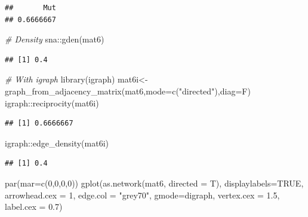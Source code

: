 \documentclass[
  notitlepage,
  onecolumn,
  openany]{book}
\newenvironment{Shaded}{\begin{snugshade}}{\end{snugshade}}
\newcommand{\AttributeTok}[1]{\textcolor[rgb]{0.77,0.63,0.00}{#1}}
\newcommand{\CommentTok}[1]{\textcolor[rgb]{0.56,0.35,0.01}{\textit{#1}}}
\newcommand{\ConstantTok}[1]{\textcolor[rgb]{0.00,0.00,0.00}{#1}}
\newcommand{\DecValTok}[1]{\textcolor[rgb]{0.00,0.00,0.81}{#1}}
\newcommand{\FloatTok}[1]{\textcolor[rgb]{0.00,0.00,0.81}{#1}}
\newcommand{\FunctionTok}[1]{\textcolor[rgb]{0.00,0.00,0.00}{#1}}
\newcommand{\NormalTok}[1]{#1}
\newcommand{\OtherTok}[1]{\textcolor[rgb]{0.56,0.35,0.01}{#1}}
\newcommand{\SpecialCharTok}[1]{\textcolor[rgb]{0.00,0.00,0.00}{#1}}
\newcommand{\StringTok}[1]{\textcolor[rgb]{0.31,0.60,0.02}{#1}}
\begin{document}
\begin{verbatim}
##       Mut 
## 0.6666667
\end{verbatim}

\begin{Shaded}
\begin{Highlighting}[]
\CommentTok{\# Density}
\NormalTok{sna}\SpecialCharTok{::}\FunctionTok{gden}\NormalTok{(mat6)}
\end{Highlighting}
\end{Shaded}

\begin{verbatim}
## [1] 0.4
\end{verbatim}

\begin{Shaded}
\begin{Highlighting}[]
\CommentTok{\# With igraph}
\FunctionTok{library}\NormalTok{(igraph)}
\NormalTok{mat6i}\OtherTok{\textless{}{-}}\FunctionTok{graph\_from\_adjacency\_matrix}\NormalTok{(mat6,}\AttributeTok{mode=}\FunctionTok{c}\NormalTok{(}\StringTok{"directed"}\NormalTok{),}\AttributeTok{diag=}\NormalTok{F)}
\NormalTok{igraph}\SpecialCharTok{::}\FunctionTok{reciprocity}\NormalTok{(mat6i)}
\end{Highlighting}
\end{Shaded}

\begin{verbatim}
## [1] 0.6666667
\end{verbatim}

\begin{Shaded}
\begin{Highlighting}[]
\NormalTok{igraph}\SpecialCharTok{::}\FunctionTok{edge\_density}\NormalTok{(mat6i)}
\end{Highlighting}
\end{Shaded}

\begin{verbatim}
## [1] 0.4
\end{verbatim}

\begin{Shaded}
\begin{Highlighting}[]
\FunctionTok{par}\NormalTok{(}\AttributeTok{mar=}\FunctionTok{c}\NormalTok{(}\DecValTok{0}\NormalTok{,}\DecValTok{0}\NormalTok{,}\DecValTok{0}\NormalTok{,}\DecValTok{0}\NormalTok{))}
\FunctionTok{gplot}\NormalTok{(}\FunctionTok{as.network}\NormalTok{(mat6, }\AttributeTok{directed =}\NormalTok{  T),}
     \AttributeTok{displaylabels=}\ConstantTok{TRUE}\NormalTok{, }
     \AttributeTok{arrowhead.cex =} \DecValTok{1}\NormalTok{, }
     \AttributeTok{edge.col =} \StringTok{"grey70"}\NormalTok{,}
     \AttributeTok{gmode=}\StringTok{\textquotesingle{}digraph\textquotesingle{}}\NormalTok{,}
     \AttributeTok{vertex.cex =} \FloatTok{1.5}\NormalTok{,}
     \AttributeTok{label.cex =} \FloatTok{0.7}\NormalTok{)}
\end{Highlighting}
\end{Shaded}
\end{document}
